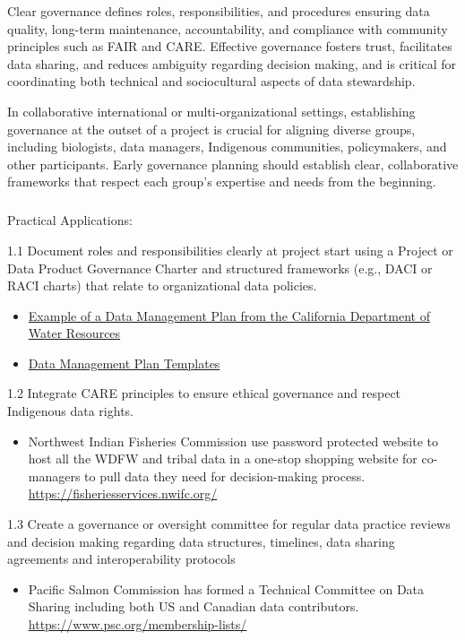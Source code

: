 \documentclass[
  letterpaper,
  DIV=11,
  numbers=noendperiod]{scrartcl}
\makeatletter
\let\oldsubparagraph\subparagraph
\renewcommand{\subparagraph}{
    \@ifstar
      \xxxSubParagraphStar
      \xxxSubParagraphNoStar
  }
\newcommand{\xxxSubParagraphStar}[1]{\oldsubparagraph*{#1}\mbox{}}
\newcommand{\xxxSubParagraphNoStar}[1]{\oldsubparagraph{#1}\mbox{}}
\providecommand{\tightlist}{%
  \setlength{\itemsep}{0pt}\setlength{\parskip}{0pt}}\usepackage{longtable,booktabs,array}
\makeatother
\begin{document}
Clear governance defines roles, responsibilities, and procedures
ensuring data quality, long-term maintenance, accountability, and
compliance with community principles such as FAIR and CARE. Effective
governance fosters trust, facilitates data sharing, and reduces
ambiguity regarding decision making, and is critical for coordinating
both technical and sociocultural aspects of data stewardship.

In collaborative international or multi-organizational settings,
establishing governance at the outset of a project is crucial for
aligning diverse groups, including biologists, data managers, Indigenous
communities, policymakers, and other participants. Early governance
planning should establish clear, collaborative frameworks that respect
each group's expertise and needs from the beginning.~

\subparagraph{Practical Applications:}\label{practical-applications}

1.1 Document roles and responsibilities clearly at project start using a
Project or Data Product Governance Charter and structured frameworks
(e.g., DACI or RACI charts) that relate to organizational data policies.

\begin{itemize}
\item
  \href{https://raw.githubusercontent.com/Br-Johnson/sdm-paper/refs/heads/main/examples/Cal_DMP.pdf}{Example
  of a Data Management Plan from the California Department of Water
  Resources}
\item
  \href{https://dmptool.org/public_templates?page=ALL}{Data Management
  Plan Templates}
\end{itemize}

1.2 Integrate CARE principles to ensure ethical governance and respect
Indigenous data rights.

\begin{itemize}
\tightlist
\item
  Northwest Indian Fisheries Commission use password protected website
  to host all the WDFW and tribal data in a one-stop shopping website
  for co-managers to pull data they need for decision-making process.
  \url{https://fisheriesservices.nwifc.org/}
\end{itemize}

1.3 Create a governance or oversight committee for regular data practice
reviews and decision making regarding data structures, timelines, data
sharing agreements and interoperability protocols

\begin{itemize}
\tightlist
\item
  Pacific Salmon Commission has formed a Technical Committee on Data
  Sharing including both US and Canadian data contributors.
  \url{https://www.psc.org/membership-lists/}
\end{itemize}
\end{document}
